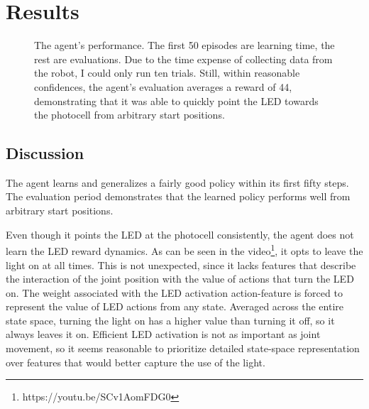 \documentclass{article}
\begin{document}


\section{Results}


	\begin{figure}[h]
		\begin{center}
			\caption{The agent's performance. The first 50 episodes are learning time, the rest are evaluations. Due to the time expense of collecting data from the robot, I could only run ten trials. Still, within reasonable confidences, the agent's evaluation averages a reward of 44, demonstrating that it was able to quickly point the LED towards the photocell from arbitrary start positions.}
		\end{center}
	\end{figure}
	
\subsection{Discussion}

The agent learns and generalizes a fairly good policy within its first fifty steps. The evaluation period demonstrates that the learned policy performs well from arbitrary start positions. 

Even though it points the LED at the photocell consistently, the agent does not learn the LED reward dynamics. As can be seen in the video\footnote{https://youtu.be/SCv1AomFDG0}, it opts to leave the light on at all times. This is not unexpected, since it lacks features that describe the interaction of the joint position with the value of actions that turn the LED on. The weight associated with the LED activation action-feature is forced to represent the value of LED actions from any state. Averaged across the entire state space, turning the light on has a higher value than turning it off, so it always leaves it on. Efficient LED activation is not as important as joint movement, so it seems reasonable to prioritize detailed state-space representation over features that would better capture the use of the light.


\end{document}
